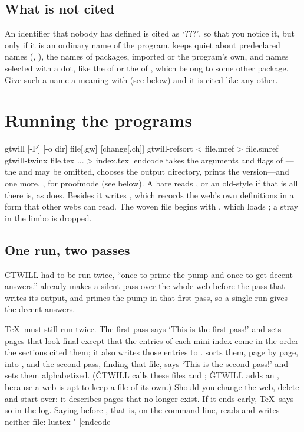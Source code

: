 \section{What is not cited}
An identifier that nobody has defined is cited as `???', so that you notice it,
but only if it is an ordinary name of the program.  keeps quiet about
predeclared names (, ), the names of packages, imported or the
program's own, and names selected with a dot, like the  of
 or the  of , which belong to some other
package. Give such a name a meaning with  (see below) and it is cited
like any other.

\chapter{Running the programs}
\begincode
gtwill [-P] [-o dir] file[.gw] [change[.ch]]
gtwill-refsort < file.mref > file.smref
gtwill-twinx file.tex ... > index.tex
|endcode
 takes the arguments and flags of ---the  and
 may be omitted,  chooses the output directory, 
prints the version---and one more, , for proofmode (see below). A bare
 reads , or an old-style  if that is all there is,
as  does. Besides
 it writes , which records the web's own definitions
in a form that other webs can read. The woven file begins with , which loads ; a stray  in the limbo is
dropped.

\section{One run, two passes}
\.{CTWILL} had to be run twice, ``once to prime the pump and once to get decent
answers.''  already makes a silent pass over the whole web before the
pass that writes its output, and  primes the pump in that first pass,
so a single run gives the decent answers.

\TeX\ must still run twice. The first pass says `This is the first pass!' and
sets pages that look final except that the entries of each mini-index come in
the order the sections cited them; it also writes those entries to
.  sorts them, page by page, into
, and the second pass, finding that file, says `This is the second
pass!' and sets them alphabetized. (\.{CTWILL} calls these files  and
; \.{GTWILL} adds an , because a web is apt to keep a 
file of its own.) Should you change the web, delete  and start
over: it describes pages that no longer exist. If it ends early, \TeX\ says so in
the log. Saying  before , that
is, on the command line, reads and writes neither file:
\begincode
luatex "\let\norefs=\relax 
|endcode

